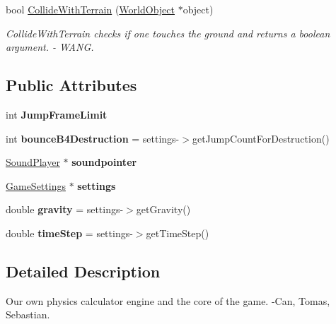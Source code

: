 \begin{DoxyCompactItemize}
bool \hyperlink{class_physics_calc_a88dc6d26563c0a340cd5c4470801b419}{Collide\+With\+Terrain} (\hyperlink{class_world_object}{World\+Object} $\ast$object)
\begin{DoxyCompactList}\small\item\em Collide\+With\+Terrain checks if one touches the ground and returns a boolean argument. -\/ W\+A\+NG. \end{DoxyCompactList}\end{DoxyCompactItemize}
\subsection*{Public Attributes}
\begin{DoxyCompactItemize}
\item 
int {\bfseries Jump\+Frame\+Limit}\hypertarget{class_physics_calc_a72b7108e3e2f8cd8fb709849dbb2506c}{}\label{class_physics_calc_a72b7108e3e2f8cd8fb709849dbb2506c}

\item 
int {\bfseries bounce\+B4\+Destruction} = settings-\/$>$get\+Jump\+Count\+For\+Destruction()\hypertarget{class_physics_calc_a774c280f0c153e3a879d51f10091800a}{}\label{class_physics_calc_a774c280f0c153e3a879d51f10091800a}

\item 
\hyperlink{class_sound_player}{Sound\+Player} $\ast$ {\bfseries soundpointer}\hypertarget{class_physics_calc_aa292db7cbe605b0b7cb95a0548afcd29}{}\label{class_physics_calc_aa292db7cbe605b0b7cb95a0548afcd29}

\item 
\hyperlink{class_game_settings}{Game\+Settings} $\ast$ {\bfseries settings}\hypertarget{class_physics_calc_ace492cdc5b24e04044d0ed249917d93e}{}\label{class_physics_calc_ace492cdc5b24e04044d0ed249917d93e}

\item 
double {\bfseries gravity} = settings-\/$>$get\+Gravity()\hypertarget{class_physics_calc_ab941acb0b7803cb4dd1bc60fd3381043}{}\label{class_physics_calc_ab941acb0b7803cb4dd1bc60fd3381043}

\item 
double {\bfseries time\+Step} = settings-\/$>$get\+Time\+Step()\hypertarget{class_physics_calc_aeb23b46816202fed3cab9aa0d852f6a9}{}\label{class_physics_calc_aeb23b46816202fed3cab9aa0d852f6a9}

\end{DoxyCompactItemize}


\subsection{Detailed Description}
Our own physics calculator engine and the core of the game. -\/\+Can, Tomas, Sebastian. 

